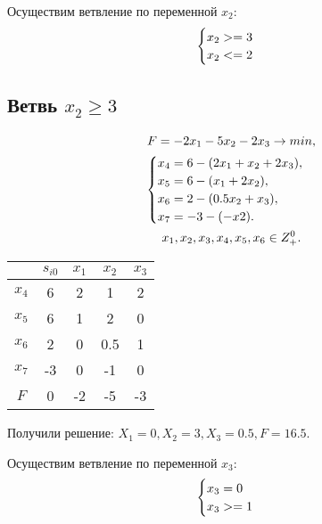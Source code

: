 \documentclass[12pt,a4paper,oneside]{extarticle}
\begin{document}
    Осуществим ветвление по переменной $x_2$:
    \begin{gather}
        \begin{cases}
            x_2 >= 3 \\
            x_2 <= 2            
        \end{cases} \notag 
    \end{gather}

    \subsection{Ветвь $x_2 \geq 3$}
        \begin{gather}
            F = -2x_1-5x_2-2x_3 \rightarrow min,  \notag  \\
            \begin{cases}
                x_4 = 6 - (2x_1 + x_2 + 2x_3), \\
                x_5 = 6 - (x_1 + 2x_2),\\
                x_6 = 2 - (0.5x_2 + x_3), \\
                x_7 = -3 - (-x2).
            \end{cases} 
            \notag \\
            x_1, x_2, x_3, x_4, x_5, x_6 \in Z^0_+. \notag
        \end{gather}

        \begin{center}
        \begin{tabular}{|c|c|c|c|c|}
            \hline
                 & $s_{i0}$ & $x_1$ & $x_2$ & $x_3$ \\ \hline
            $x_4$ & 6       & 2     & 1     & 2 \\ \hline
            $x_5$ & 6       & 1     & 2     & 0 \\ \hline
            $x_6$ & 2       & 0     & 0.5   & 1 \\ \hline
            $x_7$ & -3      & 0     & -1    & 0 \\ \hline
            $F$   & 0       & -2    & -5    & -3 \\ \hline
        \end{tabular}
        \end{center}

        Получили решение: $X_1=0, X_2=3, X_3=0.5,  F=16.5$.

        Осуществим ветвление по переменной $x_3$:
        \begin{gather}
            \begin{cases}
                x_3 = 0 \\
                x_3 >= 1                             
            \end{cases} \notag 
        \end{gather}
\end{document}
